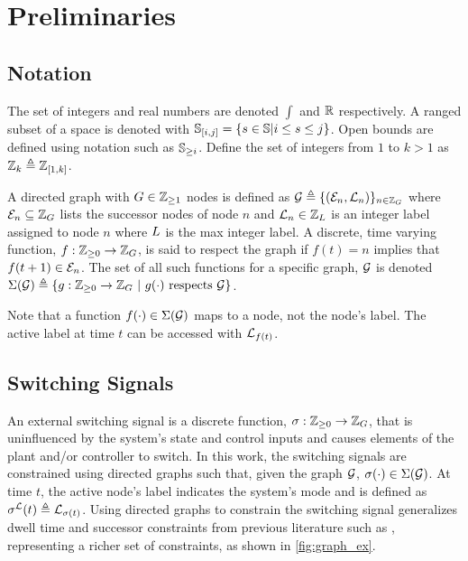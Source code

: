 \section{Preliminaries}

\subsection{Notation}\label{sec:notation}
The set of integers and real numbers are denoted $\int$ and $\mathbb{R}$ respectively. A ranged subset of a space is denoted with $\mathbb{S}_{[i,j]}=\{s\in\mathbb{S}|i\leq s\leq j\}$. Open bounds are defined using notation such as $\mathbb{S}_{\geq i}$. Define the set of integers from $1$ to $k>1$ as $\mathbb{Z}_{k}\triangleq\mathbb{Z}_{[1,k]}$.

A directed graph with $\gnumnodes\in\int\rgeq{1}$ nodes is defined as $\graph\triangleq\{(\gnodeedges{n},\gnodelabel{n})\}_{n\in\idxset{\gnumnodes}}$ where $\gnodeedges{n}\subseteq\idxset{\gnumnodes}$ lists the successor nodes of node $n$ and $\mathcal{L}_{n}\in\mathbb{Z}_{L}$ is an integer label assigned to node $n$ where $L$ is the max integer label. A discrete, time varying function, $f:\int\rgeq{0}\rightarrow\idxset{\gnumnodes}$, is said to respect the graph if $f(t)=n$ implies that $f(t+1)\in\gnodeedges{n}$. The set of all such functions for a specific graph, $\mathcal{G}$ is denoted $\Sigma(\mathcal{G})\triangleq\{g:\int\rgeq{0}\rightarrow\idxset{\gnumnodes}\ |\ g(\cdot)\text{ respects }\graph\}$. 
\begin{remark}
Note that a function $f(\cdot)\in\Sigma(\mathcal{G})$ maps to a node, not the node's label. The active label at time $t$ can be accessed with $\mathcal{L}_{f(t)}$. 
\end{remark}

\subsection{Switching Signals}
An external switching signal is a discrete function, $\ss:\int\rgeq{0}\rightarrow \idxset{\gnumnodes}$, that is uninfluenced by the system's state and control inputs and causes elements of the plant and/or controller to switch. In this work, the switching signals are constrained using directed graphs such that, given the graph $\mathcal{G}$, ${\sigma}(\cdot)\in\Sigma(\mathcal{G})$. At time $t$, the active node's label indicates the system's mode and is defined as $\ssl(t)\triangleq \gnodelabel{\ss(t)}$. Using directed graphs to constrain the switching signal generalizes dwell time and successor constraints from previous literature such as \cite{Danielson2019, Hall2022, Zhang2016}, representing a richer set of constraints, as shown in \autoref{fig:graph_ex}.

